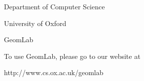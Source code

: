
\hyperlinks

\blanktrue
\centerline{\fourteensf Department of Computer Science}
\medskip
\centerline{\fourteensf University of Oxford}
\bigskip
\centerline{\twentyfoursf GeomLab}
\bigskip
\bigskip
To use GeomLab, please go to our website at
\medskip
\centerline{%
  {http://www.cs.ox.ac.uk/geomlab}}

\bigskip
\bigskip
\centerline{}
\vfill
\eject

\bye
